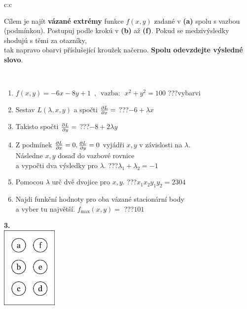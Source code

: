 \documentclass[10pt]{report}
\begin{document}
\begin{tabular}{c:c}
\begin{minipage}[c][104.5mm][t]{0.5\linewidth}
\begin{center}
\begin{minipage}{0.95\linewidth}
\begin{center}
Cílem je najít \textbf{vázané extrémy} funkce $f(x,y)$ zadané v \textbf{(a)} spolu s vazbou (podmínkou). Postupuj podle krokú v \textbf{(b)} až \textbf{(f)}. Pokud se medzivýsledky shodujú s těmi za otazníky,\\tak napravo obarvi příslušející kroužek načerno. \textbf{Spolu odevzdejte výsledné slovo}.
\end{center}
\end{minipage}
\\[1mm]
\begin{minipage}{0.79\linewidth}
\begin{center}
\begin{varwidth}{\linewidth}
\begin{enumerate}
\normalsize
\item $f(x,y)=-6x-8y+1 \enspace , \enspace \mathrm{vazba:} \enspace x^2+y^2=100$\quad \dotfill\; ???\;\dotfill \quad vybarvi
\item Sestav $L(\lambda,x,y)$ a spočti $\pdv{L}{x}=$\quad \dotfill\; ???\;\dotfill \quad $-6+\lambda x$
\item Takisto spočti $\pdv{L}{y}=$\quad \dotfill\; ???\;\dotfill \quad $-8+2\lambda y$
\item Z podmínek $\pdv{L}{x}=0 , \pdv{L}{y}=0$ vyjádři $x,y$ v závislosti na $\lambda$.\\ \phantom{xxxxxx}Následne $x,y$ dosaď do vazbové rovnice\\ \phantom{xxxxxx}a vypočti dva výsledky pro $\lambda$.\quad \dotfill\; ???\;\dotfill \quad $\lambda_1+\lambda_2=-1$
\item Pomocou $\lambda$ urč dvě dvojice pro $x,y$.\quad \dotfill\; ???\;\dotfill \quad $x_1 x_2 y_1 y_2=2304$
\item Najdi funkční hodnoty pro oba vázané stacionární body\\ \phantom{xxxxxx}a vyber tu najvětší. $f_{\text{max}}(x,y)=$\quad \dotfill\; ???\;\dotfill \quad $101$
\end{enumerate}
\end{varwidth}
\end{center}
\end{minipage}
\begin{minipage}{0.20\linewidth}
\begin{center}
{\Huge\bfseries 3.} \\[2mm]
\includegraphics[height=40mm]{../images/braille.png}

\end{center}
\end{minipage}
\end{center}
\end{minipage}
\end{tabular}
\end{document}
